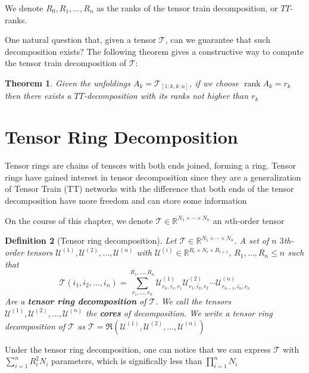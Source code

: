 \documentclass[11pt,a4paper,openright,oneside]{book}
\numberwithin{equation}{section}
\newtheorem{defn0}{Definition}[chapter]
\newtheorem{thm0}[defn0]{Theorem}
\newenvironment{definition}{ \begin{defn0}}{\end{defn0}}
\newenvironment{theorem}{\bigskip \begin{thm0}}{\end{thm0}}
\DeclareMathOperator{\rank}{rank}
\begin{document}
We denote $R_0, R_1, \dots, R_n$ as the ranks of the tensor train decomposition, or $TT$-ranks.

One natural question that, given a tensor $\mathcal{T}$, can we guarantee that such decomposition exists? The following theorem
gives a constructive way to compute the tensor train decomposition of $\mathcal{T}$:


\begin{theorem}
    Given the unfoldings $A_k = \mathcal{T}_{[1:k, k:n]}$, if we choose $\rank{A_k} = r_k$ then there exists a $TT$-decomposition
    with its ranks not higher than $r_k$
\end{theorem}

\section{Tensor Ring Decomposition}

Tensor rings are chains of tensors with both ends joined, forming a ring. Tensor rings
have gained interest in tensor decomposition since they are a generalization of Tensor Train (TT) networks with
the difference that both ends of the tensor decomposition have more freedom and can store some information \cite{wangWideCompressionTensor2018}

On the course of this chapter, we denote $\mathcal{T} \in \mathbb{R}^{N_1 \times \cdots \times N_n}$ an $n$th-order tensor

\begin{definition}[Tensor ring decomposition]
    Let $\mathcal{T} \in \mathbb{R}^{N_1 \times \cdots \times N_n}$. A set of $n$ $3$th-order tensors $\mathcal{U}^{(1)}, \mathcal{U}^{(2)}, \dots, \mathcal{U}^{(n)}$
    with $\mathcal{U}^{(i)} \in \mathbb{R}^{R_i \times N_i \times R_{i+1}}$, $R_1, \dots, R_n \leqslant n$ such that
    $$\mathcal{T}(i_1, i_2, \dots, i_n) = \sum_{r_1, \dots, r_n}^{R_1, \dots, R_n} \mathcal{U}_{r_n, i_1, r_1}^{(1)} \mathcal{U}_{r_1, i_2, r_2}^{(2)} \cdots \mathcal{U}_{r_{n-1}, i_n, r_n}^{(n)}$$
    Are a \textbf{tensor ring decomposition} of $\mathcal{T}$. We call the tensors $\mathcal{U}^{(1)}, \mathcal{U}^{(2)}, \dots, \mathcal{U}^{(n)}$ the \textbf{cores} of 
    decomposition. We write a tensor ring decomposition of $\mathcal{T}$ as $\mathcal{T} = \mathfrak{R}(\mathcal{U}^{(1)}, \mathcal{U}^{(2)}, \dots, \mathcal{U}^{(n)})$
\end{definition}

Under the tensor ring decomposition, one can notice that we can express $\mathcal{T}$ with $\sum_{i=1}^n R_i^2 N_i$ parameters,
which is significally less than $\prod_{i=1}^n N_i$
\end{document}
